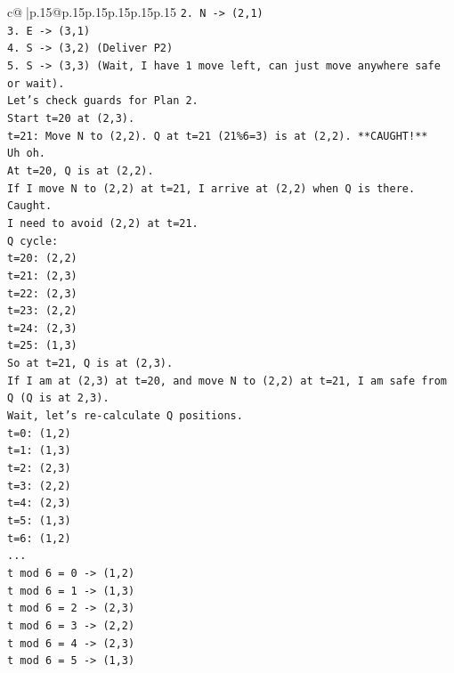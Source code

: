 \documentclass{article}
\begin{document}
{\begin{supertabular}{c@{$\;$}|p{.15\linewidth}@{}p{.15\linewidth}p{.15\linewidth}p{.15\linewidth}p{.15\linewidth}p{.15\linewidth}}
{{{\texttt{2. N {-}> (2,1)} \\
\texttt{3. E {-}> (3,1)} \\
\texttt{4. S {-}> (3,2) (Deliver P2)} \\
\texttt{5. S {-}> (3,3) (Wait, I have 1 move left, can just move anywhere safe or wait).} \\
\texttt{Let's check guards for Plan 2.} \\
\texttt{Start t=20 at (2,3).} \\
\texttt{t=21: Move N to (2,2). Q at t=21 (21\%6=3) is at (2,2). **CAUGHT!**} \\
\texttt{Uh oh.} \\
\texttt{At t=20, Q is at (2,2).} \\
\texttt{If I move N to (2,2) at t=21, I arrive at (2,2) when Q is there. Caught.} \\
\texttt{I need to avoid (2,2) at t=21.} \\
\texttt{Q cycle:} \\
\texttt{t=20: (2,2)} \\
\texttt{t=21: (2,3)} \\
\texttt{t=22: (2,3)} \\
\texttt{t=23: (2,2)} \\
\texttt{t=24: (2,3)} \\
\texttt{t=25: (1,3)} \\
\texttt{So at t=21, Q is at (2,3).} \\
\texttt{If I am at (2,3) at t=20, and move N to (2,2) at t=21, I am safe from Q (Q is at 2,3).} \\
\texttt{Wait, let's re{-}calculate Q positions.} \\
\texttt{t=0: (1,2)} \\
\texttt{t=1: (1,3)} \\
\texttt{t=2: (2,3)} \\
\texttt{t=3: (2,2)} \\
\texttt{t=4: (2,3)} \\
\texttt{t=5: (1,3)} \\
\texttt{t=6: (1,2)} \\
\texttt{...} \\
\texttt{t mod 6 = 0 {-}> (1,2)} \\
\texttt{t mod 6 = 1 {-}> (1,3)} \\
\texttt{t mod 6 = 2 {-}> (2,3)} \\
\texttt{t mod 6 = 3 {-}> (2,2)} \\
\texttt{t mod 6 = 4 {-}> (2,3)} \\
\texttt{t mod 6 = 5 {-}> (1,3)} \\
}}}
\end{supertabular}}
\end{document}
